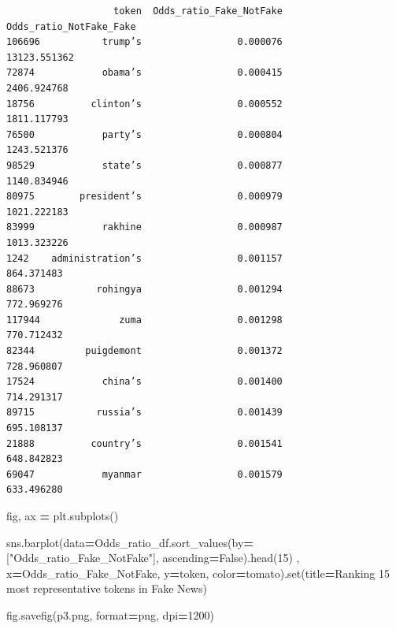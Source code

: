 \documentclass[
  11pt,
  a4paper,
]{article}
\newenvironment{Shaded}{\begin{snugshade}}{\end{snugshade}}
\newcommand{\BuiltInTok}[1]{#1}
\newcommand{\DecValTok}[1]{\textcolor[rgb]{0.00,0.00,0.81}{#1}}
\newcommand{\NormalTok}[1]{#1}
\newcommand{\OperatorTok}[1]{\textcolor[rgb]{0.81,0.36,0.00}{\textbf{#1}}}
\newcommand{\StringTok}[1]{\textcolor[rgb]{0.31,0.60,0.02}{#1}}
\newcommand{\VariableTok}[1]{\textcolor[rgb]{0.00,0.00,0.00}{#1}}
\begin{document}
\begin{verbatim}
                   token  Odds_ratio_Fake_NotFake  Odds_ratio_NotFake_Fake
106696           trump’s                 0.000076             13123.551362
72874            obama’s                 0.000415              2406.924768
18756          clinton’s                 0.000552              1811.117793
76500            party’s                 0.000804              1243.521376
98529            state’s                 0.000877              1140.834946
80975        president’s                 0.000979              1021.222183
83999            rakhine                 0.000987              1013.323226
1242    administration’s                 0.001157               864.371483
88673           rohingya                 0.001294               772.969276
117944              zuma                 0.001298               770.712432
82344         puigdemont                 0.001372               728.960807
17524            china’s                 0.001400               714.291317
89715           russia’s                 0.001439               695.108137
21888          country’s                 0.001541               648.842823
69047            myanmar                 0.001579               633.496280
\end{verbatim}

\begin{Shaded}
\begin{Highlighting}[]
\NormalTok{fig, ax }\OperatorTok{=}\NormalTok{ plt.subplots()}

\NormalTok{sns.barplot(data}\OperatorTok{=}\NormalTok{Odds\_ratio\_df.sort\_values(by}\OperatorTok{=}\NormalTok{[}\StringTok{"Odds\_ratio\_Fake\_NotFake"}\NormalTok{], ascending}\OperatorTok{=}\VariableTok{False}\NormalTok{).head(}\DecValTok{15}\NormalTok{) ,}
\NormalTok{                 x}\OperatorTok{=}\StringTok{\textquotesingle{}Odds\_ratio\_Fake\_NotFake\textquotesingle{}}\NormalTok{, y}\OperatorTok{=}\StringTok{\textquotesingle{}token\textquotesingle{}}\NormalTok{, color}\OperatorTok{=}\StringTok{\textquotesingle{}tomato\textquotesingle{}}\NormalTok{).}\BuiltInTok{set}\NormalTok{(title}\OperatorTok{=}\StringTok{\textquotesingle{}Ranking 15 most representative tokens in Fake News\textquotesingle{}}\NormalTok{) }

\NormalTok{fig.savefig(}\StringTok{\textquotesingle{}p3.png\textquotesingle{}}\NormalTok{, }\BuiltInTok{format}\OperatorTok{=}\StringTok{\textquotesingle{}png\textquotesingle{}}\NormalTok{, dpi}\OperatorTok{=}\DecValTok{1200}\NormalTok{)}
\end{Highlighting}
\end{Shaded}
\end{document}
